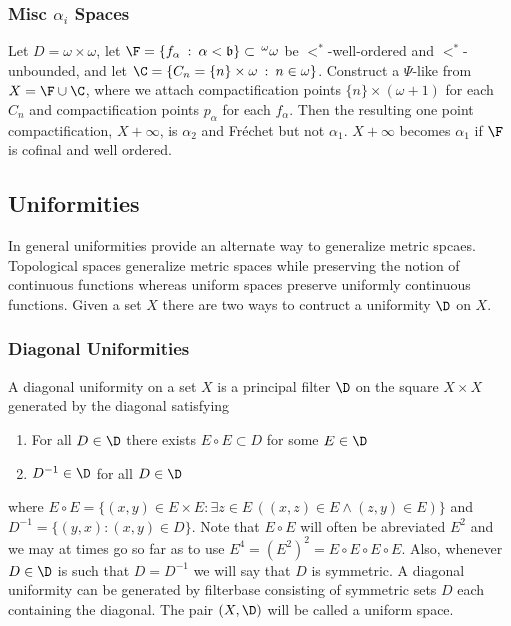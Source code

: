 \documentclass{article}
\begin{document}
\subsubsection{Misc \(\alpha_i\) Spaces}

\begin{exam}
     Let \(D = \omega\times\omega\), let \(\F = \{f_{\alpha} \: : \: \alpha < \mathfrak{b}\} \subset \, ^\omega\omega\) be \(<^{\ast}\)-well-ordered and \(<^{\ast}\)-unbounded, and let \(\C = \{C_n = \{n\} \times \omega \: : \: n \in \omega\}\). Construct a \(\Psi\)-like from \(X = \F \cup \C\), where we attach compactification points \(\{n\} \times (\omega+1)\) for each \(C_n\) and compactification points \(p_{\alpha}\) for each \(f_{\alpha}\). Then the resulting one point compactification, \(X + \infty\), is \(\alpha_2\) and Fréchet but not \(\alpha_1\). \(X + \infty\) becomes \(\alpha_1\) if \(\F\) is cofinal and well ordered. 
\end{exam}
\subsection{Uniformities}
    In general uniformities provide an alternate way to generalize metric spcaes. Topological spaces generalize metric spaces while preserving the notion of continuous functions whereas uniform spaces preserve  uniformly continuous functions. Given a set \(X\) there are two ways to contruct a uniformity \(\D\) on \(X\). 
    
\subsubsection{Diagonal Uniformities}
    A diagonal uniformity on a set \(X\) is a principal filter \(\D\) on the square \(X \times X\) generated by the diagonal satisfying 
    \begin{enumerate}
        \item For all \(D \in \D\) there exists \(E \circ E \subset D\) for some \(E \in \D\)
        \item \(D^{-1} \in \D\) for all \(D \in \D\)
    \end{enumerate}
    where \(E \circ E  = \{(x, y) \in E \times E: \exists z \in E\,((x,z) \in E \wedge (z, y) \in E)\}\) and \(D^{-1} = \{(y, x): (x, y) \in D\}\). Note that \(E\circ E\) will often be abreviated \(E^2\) and we may at times go so far as to use \(E^4 = (E^2)^2 = E\circ E\circ E\circ E\). Also, whenever \(D \in \D\) is such that \(D = D^{-1}\) we will say that \(D\) is symmetric. A diagonal uniformity can be generated by filterbase consisting of symmetric sets \(D\) each containing the diagonal. The pair \((X, \D)\) will be called a uniform space.
\end{document}
